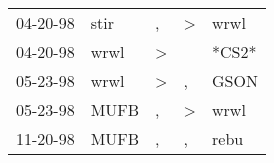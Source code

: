 \begin{supertabular}{lllll}
 04-20-98 &  stir &             , &  \textgreater &   wrwl \\
 04-20-98 &  wrwl &  \textgreater &               &  *CS2* \\
 05-23-98 &  wrwl &  \textgreater &             , &   GSON \\
 05-23-98 &  MUFB &             , &  \textgreater &   wrwl \\
 11-20-98 &  MUFB &             , &             , &   rebu \\
\end{supertabular}
